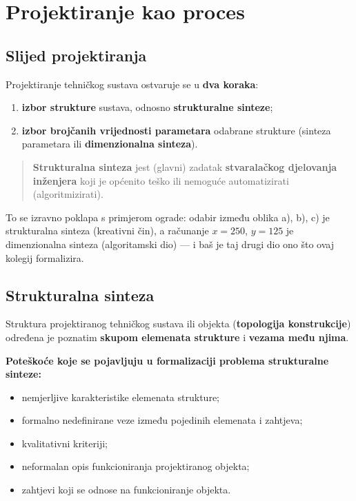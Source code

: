 \section{Projektiranje kao proces}

\subsection{Slijed projektiranja}

Projektiranje tehničkog sustava ostvaruje se u \textbf{dva koraka}:

\begin{enumerate}
  \item \textbf{izbor strukture} sustava, odnosno \textbf{strukturalne sinteze};
  \item \textbf{izbor brojčanih vrijednosti parametara} odabrane strukture
        (sinteza parametara ili \textbf{dimenzionalna sinteza}).
\end{enumerate}

\begin{quote}
\textbf{Strukturalna sinteza} jest (glavni) zadatak \textbf{stvaralačkog
djelovanja inženjera} koji je općenito teško ili nemoguće automatizirati
(algoritmizirati).
\end{quote}

To se izravno poklapa s primjerom ograde: odabir između oblika a), b), c) je
strukturalna sinteza (kreativni čin), a računanje $x = 250$, $y = 125$ je
dimenzionalna sinteza (algoritamski dio) --- i baš je taj drugi dio ono što ovaj
kolegij formalizira.

\subsection{Strukturalna sinteza}

Struktura projektiranog tehničkog sustava ili objekta (\textbf{topologija
konstrukcije}) određena je poznatim \textbf{skupom elemenata strukture} i
\textbf{vezama među njima}.

\textbf{Poteškoće koje se pojavljuju u formalizaciji problema strukturalne
sinteze:}
\begin{itemize}
  \item nemjerljive karakteristike elemenata strukture;
  \item formalno nedefinirane veze između pojedinih elemenata i zahtjeva;
  \item kvalitativni kriteriji;
  \item neformalan opis funkcioniranja projektiranog objekta;
  \item zahtjevi koji se odnose na funkcioniranje objekta.
\end{itemize}

